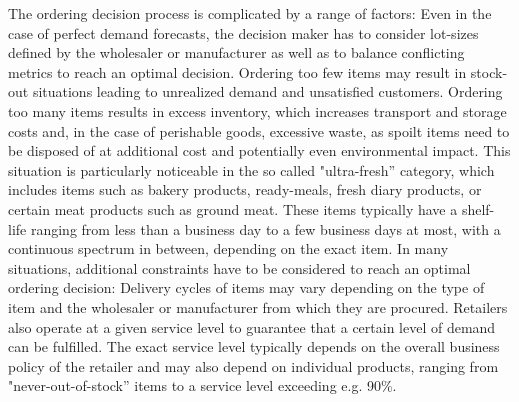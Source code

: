 \documentclass[BCOR=1mm, DIV=calc,10pt,
twoside=true,
twocolumn,
headings=normal]{scrartcl}
\begin{document}
The ordering decision process is complicated by a range of factors: Even in the case of perfect demand forecasts, the decision maker has to consider lot-sizes defined by the wholesaler or manufacturer as well as to balance conflicting metrics to reach an optimal decision. Ordering too few items may result in stock-out situations leading to unrealized demand and unsatisfied customers. Ordering too many items results in excess inventory, which increases transport and storage costs and, in the case of perishable goods, excessive waste, as spoilt items need to be disposed of at additional cost and potentially even environmental impact. This situation is particularly noticeable in the so called "ultra-fresh'' category, which includes items such as bakery products, ready-meals, fresh diary products, or certain meat products such as ground meat. These items typically have a shelf-life ranging from less than a business day to a few business days at most, with a continuous spectrum in between, depending on the exact item. In many situations, additional constraints have to be considered to reach an optimal ordering decision: Delivery cycles of items may vary depending on the type of item and the wholesaler or manufacturer from which they are procured. Retailers also operate at a given service level to guarantee that a certain level of demand can be fulfilled. The exact service level typically depends on the overall business policy of the retailer and may also depend on individual products, ranging from "never-out-of-stock'' items to a service level exceeding e.g. 90\%.
\end{document}
